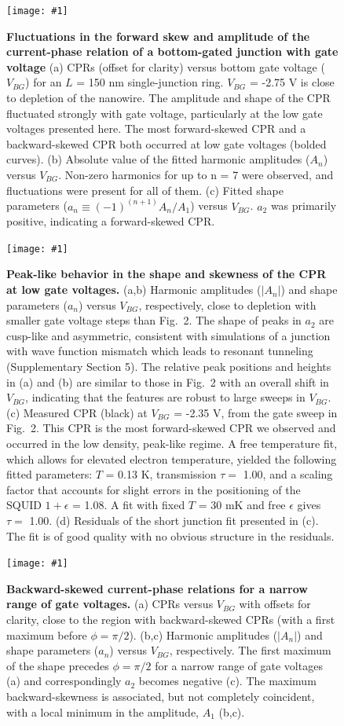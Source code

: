 \documentclass[11pt]{article}
\newcommand{\fig}[5]{
	\begin{figure}
	\centerline{\texttt{[image: \#1]}}
\caption[#3]{\label{#2} \textbf{#3} #4}
\end{figure}}
\begin{document}
\fig{./fig2.pdf}{fig:fig2}
{Fluctuations in the forward skew and amplitude of the current-phase relation of a bottom-gated junction with gate voltage}
{(a) CPRs (offset for clarity) versus bottom gate voltage ($V_{BG}$) for an $L$ = 150 nm single-junction ring. $V_{BG}$ = -2.75 V is close to depletion of the nanowire. The amplitude and shape of the CPR fluctuated strongly with gate voltage, particularly at the low gate voltages presented here. The most forward-skewed CPR and a backward-skewed CPR both occurred at low gate voltages (bolded curves). (b) Absolute value of the fitted harmonic amplitudes ($A_n$) versus $V_{BG}$. Non-zero harmonics for up to n = 7 were observed, and fluctuations were present for all of them. (c) Fitted shape parameters ($a_n \equiv (-1)^{(n+1)} A_n/A_1$) versus $V_{BG}$. $a_2$ was primarily positive, indicating a forward-skewed CPR.}{0.9}

\fig{./fig3.pdf}{fig:fig3}
{Peak-like behavior in the shape and skewness of the CPR at low gate voltages.}
{(a,b) Harmonic amplitudes ($|A_n|$) and shape parameters ($a_n$) versus $V_{BG}$, respectively, close to depletion with smaller gate voltage steps than Fig.~2. The shape of peaks in $a_2$ are cusp-like and asymmetric, consistent with simulations of a junction with wave function mismatch which leads to resonant tunneling (Supplementary Section 5). The relative peak positions and heights in (a) and (b) are similar to those in Fig.~2 with an overall shift in $V_{BG}$, indicating that the features are robust to large sweeps in $V_{BG}$. (c) Measured CPR (black) at $V_{BG}$ = -2.35 V, from the gate sweep in Fig.~2. This CPR is the most forward-skewed CPR we observed and occurred in the low density, peak-like regime. A free temperature fit, which allows for elevated electron temperature, yielded the following fitted parameters: $T$ = 0.13 K, transmission $\tau =$ 1.00, and a scaling factor that accounts for slight errors in the positioning of the SQUID $1+\epsilon$ = 1.08. A fit with fixed $T$ = 30 mK and free $\epsilon$ gives $\tau =$ 1.00. (d) Residuals of the short junction fit presented in (c). The fit is of good quality with no obvious structure in the residuals.}{0.7}

\fig{./fig4.pdf}{fig:fig4}
{Backward-skewed current-phase relations for a narrow range of gate voltages.}
{(a) CPRs versus $V_{BG}$ with offsets for clarity, close to the region with backward-skewed CPRs (with a first maximum before $\phi = \pi/2$). (b,c) Harmonic amplitudes ($|A_n|$) and shape parameters ($a_n$) versus $V_{BG}$, respectively. The first maximum of the shape precedes $\phi  = \pi/2$ for a narrow range of gate voltages (a) and correspondingly $a_2$ becomes negative (c). The maximum backward-skewness is associated, but not completely coincident, with a local minimum in the amplitude, $A_1$ (b,c).}{0.9}
\end{document}
